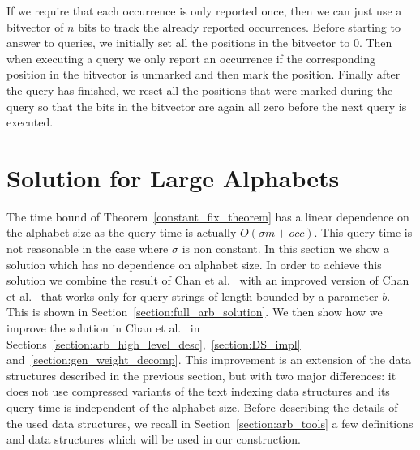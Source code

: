\documentclass{article}
\newcommand{\?}{\mskip1.5mu}
\begin{document}
If we require that each occurrence is only reported once, then we can just use a bitvector of $n$ bits to track the already reported occurrences. Before starting to answer to queries, we initially set all the positions in the bitvector to $0$. Then when executing a query we only report an occurrence if the corresponding position in the bitvector is unmarked and then mark the position. Finally after the query has finished, we reset all the positions that were marked during the query so that the bits in the bitvector are again all zero before the next query is executed. 



\section{Solution for Large Alphabets}
\label{section:large_alpha}
The time bound of Theorem~\ref{constant_fix_theorem} has a linear dependence on the alphabet size as the query time is actually $O(\sigma m+occ)$. This query time is not reasonable in the case where $\sigma$ is non constant. In this section we show a solution which has no dependence on alphabet size. In order to achieve this solution we combine the result of Chan et al.~\cite{chan2011linear} with an improved version of Chan et al.~\cite{CLSTW10} that works only for query strings of length bounded by a parameter $b$. This is shown in Section~\ref{section:full_arb_solution}. We then show how we improve the  solution in Chan et al.~\cite{CLSTW10} in Sections~\ref{section:arb_high_level_desc},~\ref{section:DS_impl} and~\ref{section:gen_weight_decomp}. 
This improvement is an extension of the data structures described in the previous section, but with two major differences: it does not use compressed variants of the text indexing data structures and its query time is independent of the alphabet size. Before describing the details of the used data structures, we recall in Section~\ref{section:arb_tools} a few definitions and data structures which will be used in our construction. 
\end{document}
